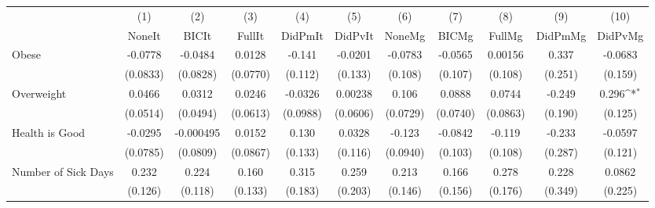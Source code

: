 {
\def\sym#1{\ifmmode^{#1}\else\(^{#1}\)\fi}
\begin{tabular}{l*{10}{c}}
\toprule
            &\multicolumn{1}{c}{(1)}&\multicolumn{1}{c}{(2)}&\multicolumn{1}{c}{(3)}&\multicolumn{1}{c}{(4)}&\multicolumn{1}{c}{(5)}&\multicolumn{1}{c}{(6)}&\multicolumn{1}{c}{(7)}&\multicolumn{1}{c}{(8)}&\multicolumn{1}{c}{(9)}&\multicolumn{1}{c}{(10)}\\
            &\multicolumn{1}{c}{NoneIt}&\multicolumn{1}{c}{BICIt}&\multicolumn{1}{c}{FullIt}&\multicolumn{1}{c}{DidPmIt}&\multicolumn{1}{c}{DidPvIt}&\multicolumn{1}{c}{NoneMg}&\multicolumn{1}{c}{BICMg}&\multicolumn{1}{c}{FullMg}&\multicolumn{1}{c}{DidPmMg}&\multicolumn{1}{c}{DidPvMg}\\
\midrule
Obese       &     -0.0778         &     -0.0484         &      0.0128         &      -0.141         &     -0.0201         &     -0.0783         &     -0.0565         &     0.00156         &       0.337         &     -0.0683         \\
            &    (0.0833)         &    (0.0828)         &    (0.0770)         &     (0.112)         &     (0.133)         &     (0.108)         &     (0.107)         &     (0.108)         &     (0.251)         &     (0.159)         \\
\addlinespace
Overweight  &      0.0466         &      0.0312         &      0.0246         &     -0.0326         &     0.00238         &       0.106         &      0.0888         &      0.0744         &      -0.249         &       0.296\sym{*}  \\
            &    (0.0514)         &    (0.0494)         &    (0.0613)         &    (0.0988)         &    (0.0606)         &    (0.0729)         &    (0.0740)         &    (0.0863)         &     (0.190)         &     (0.125)         \\
\addlinespace
Health is Good&     -0.0295         &   -0.000495         &      0.0152         &       0.130         &      0.0328         &      -0.123         &     -0.0842         &      -0.119         &      -0.233         &     -0.0597         \\
            &    (0.0785)         &    (0.0809)         &    (0.0867)         &     (0.133)         &     (0.116)         &    (0.0940)         &     (0.103)         &     (0.108)         &     (0.287)         &     (0.121)         \\
\addlinespace
Number of Sick Days&       0.232         &       0.224         &       0.160         &       0.315         &       0.259         &       0.213         &       0.166         &       0.278         &       0.228         &      0.0862         \\
            &     (0.126)         &     (0.118)         &     (0.133)         &     (0.183)         &     (0.203)         &     (0.146)         &     (0.156)         &     (0.176)         &     (0.349)         &     (0.225)         \\
\bottomrule
\end{tabular}
}
